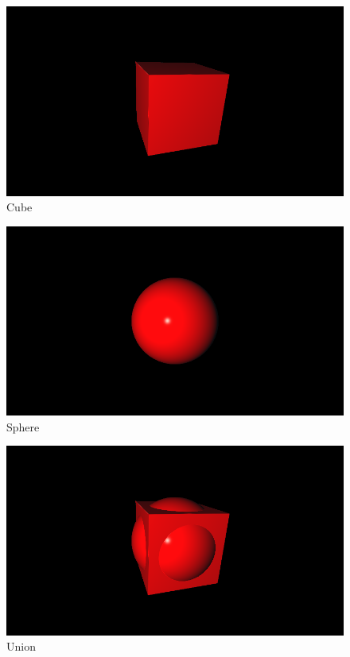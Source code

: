\begin{figure}[h!]
    \centering

    \begin{minipage}{0.3\textwidth}
        \centering
        \includegraphics[width=\linewidth]{imagens/sdf-operations/cube.png}\\
        Cube
    \end{minipage}%
    \hfill
    \begin{minipage}{0.3\textwidth}
        \centering
        \includegraphics[width=\linewidth]{imagens/sdf-operations/sphere.png}\\
        Sphere
    \end{minipage}%
    \hfill
    \begin{minipage}{0.3\textwidth}
        \centering
        \includegraphics[width=\linewidth]{imagens/sdf-operations/union.png}\\
        Union
    \end{minipage}


\end{figure}
